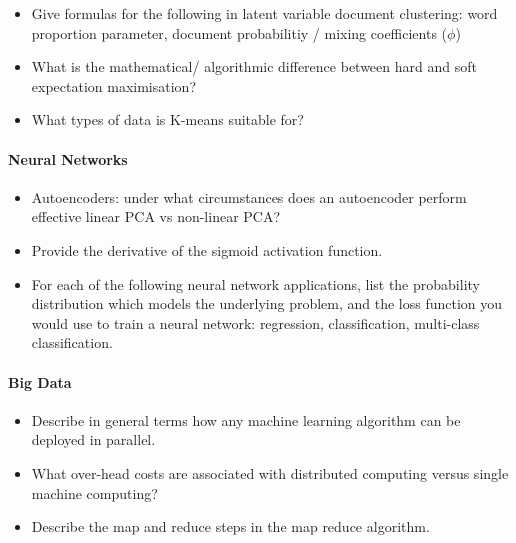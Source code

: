 \documentclass[a4paper]{article}
\begin{document}
    \begin{itemize}
     \item Give formulas for the following in latent variable document clustering: word proportion parameter, document probabilitiy / mixing coefficients ($\phi$)
     \item What is the mathematical/ algorithmic difference between hard and soft expectation maximisation? 
     \item What types of data is K-means suitable for? 
    \end{itemize}
    
    \paragraph{Neural Networks}
    
    \begin{itemize}
    \item Autoencoders: under what circumstances does an autoencoder perform effective linear PCA vs non-linear PCA?
    \item Provide the derivative of the sigmoid activation function.
    \item For each of the following neural network applications, list the probability distribution which models the underlying problem, and the loss function you would use to train a neural network: regression, classification, multi-class classification.
    \end{itemize}
   
   \paragraph{Big Data}

    \begin{itemize}
    \item Describe in general terms how any machine learning algorithm can be deployed in parallel.
    \item What over-head costs are associated with distributed computing versus single machine computing?
    \item Describe the map and reduce steps in the map reduce algorithm.
    
    \end{itemize}
   
	
	
	
	
	
\end{document}
